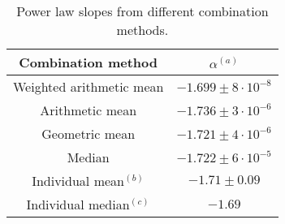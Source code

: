 \begin{table}
\centering
\begin{center}
\caption{Power law slopes from different combination methods. \label{tab:targets}}

\begin{tabular}{cc}
\hline
\noalign{\smallskip}
Combination method &  $\alpha$$^{(a)}$ \\  
\hline


Weighted arithmetic mean  & $-1.699\pm 8 \cdot 10^{-8}$   \\
Arithmetic mean  & $-1.736\pm 3 \cdot 10^{-6}$   \\
Geometric mean  & $-1.721\pm 4 \cdot 10^{-6}$   \\
Median  & $-1.722\pm 6 \cdot 10^{-5}$   \\

Individual mean$^{(b)}$  & $-1.71\pm 0.09$   \\
Individual median$^{(c)}$ & $-1.69$   \\
\hline
\hline
\end{tabular}
\end{center}


\end{table}




